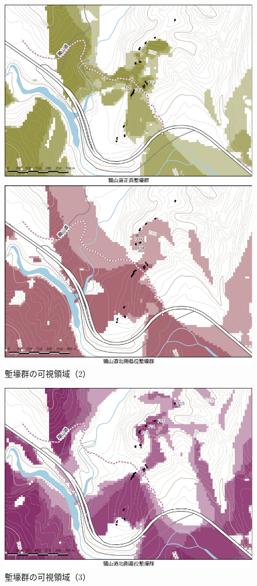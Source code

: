 \documentclass[11pt,report]{jsarticle}
\begin{document}
\begin{figure}[ht]
\centering
\includegraphics[width=160truemm]{../02fig/09view02.pdf}
\caption{塹壕群の可視領域（2）}
\label{view02}
\end{figure}

\begin{figure}[ht]
\centering
\includegraphics[width=160truemm]{../02fig/10view03.pdf}
\caption{塹壕群の可視領域（3）}
\label{view03}
\end{figure}
\end{document}

